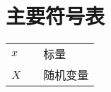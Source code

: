 \chapter*{主要符号表}

\begin{table}[h]
\centering
	\begin{tabular}{lcl}
	$x$ 		& 	&	标量 		\\ 
	
	$X$ 		&  	& 	随机变量 		\\
	
	\end{tabular}
\end{table}
